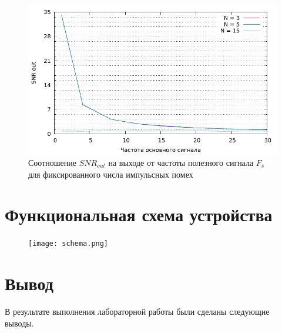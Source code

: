 \documentclass[12pt, a4paper] {ncc}
\begin{document}
        \begin{figure}[H]
            \centering
            \includegraphics[scale=0.9,page=1]{freq.pdf}
			\caption{Соотношение $SNR_{out}$ на выходе от частоты полезного сигнала $F_s$ для фиксированного числа импульсных помех}
        \end{figure}




\section*{Функциональная схема устройства}
        \begin{figure}[H]
            \centering
            \texttt{[image: schema.png]}
        \end{figure}

\section*{Вывод}

В результате выполнения лабораторной работы были сделаны следующие выводы.
\end{document}
